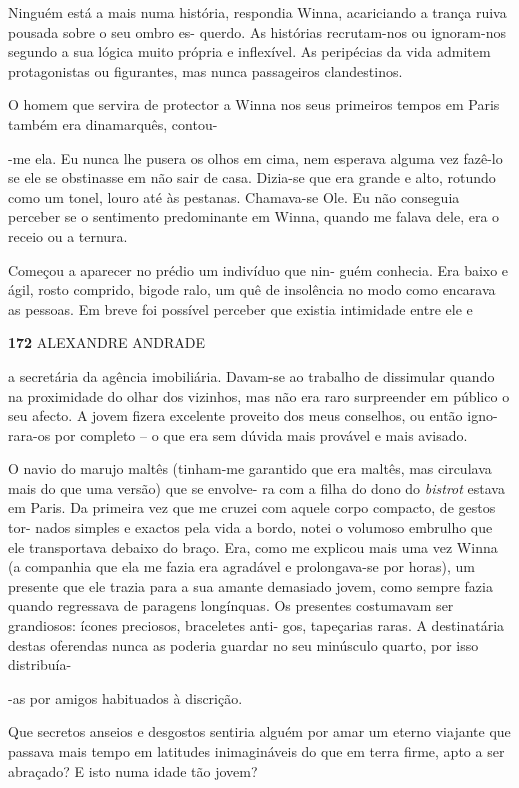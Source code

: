 Ninguém está a mais numa história, respondia Winna, acariciando a trança
ruiva pousada sobre o seu ombro es- querdo. As histórias recrutam-nos ou
ignoram-nos segundo a sua lógica muito própria e inflexível. As
peripécias da vida admitem protagonistas ou figurantes, mas nunca
passageiros clandestinos.

O homem que servira de protector a Winna nos seus primeiros tempos em
Paris também era dinamarquês, contou-

-me ela. Eu nunca lhe pusera os olhos em cima, nem esperava alguma vez
fazê-lo se ele se obstinasse em não sair de casa. Dizia-se que era
grande e alto, rotundo como um tonel, louro até às pestanas. Chamava-se
Ole. Eu não conseguia perceber se o sentimento predominante em Winna,
quando me falava dele, era o receio ou a ternura.

Começou a aparecer no prédio um indivíduo que nin- guém conhecia. Era
baixo e ágil, rosto comprido, bigode ralo, um quê de insolência no modo
como encarava as pessoas. Em breve foi possível perceber que existia
intimidade entre ele e

\textbf{172 }ALEXANDRE ANDRADE

a secretária da agência imobiliária. Davam-se ao trabalho de dissimular
quando na proximidade do olhar dos vizinhos, mas não era raro
surpreender em público o seu afecto. A jovem fizera excelente proveito
dos meus conselhos, ou então igno- rara-os por completo -- o que era sem
dúvida mais provável e mais avisado.

O navio do marujo maltês (tinham-me garantido que era maltês, mas
circulava mais do que uma versão) que se envolve- ra com a filha do dono
do \emph{bistrot }estava em Paris. Da primeira vez que me cruzei com
aquele corpo compacto, de gestos tor- nados simples e exactos pela vida
a bordo, notei o volumoso embrulho que ele transportava debaixo do
braço. Era, como me explicou mais uma vez Winna (a companhia que ela me
fazia era agradável e prolongava-se por horas), um presente que ele
trazia para a sua amante demasiado jovem, como sempre fazia quando
regressava de paragens longínquas. Os presentes costumavam ser
grandiosos: ícones preciosos, braceletes anti- gos, tapeçarias raras. A
destinatária destas oferendas nunca as poderia guardar no seu minúsculo
quarto, por isso distribuía-

-as por amigos habituados à discrição.

Que secretos anseios e desgostos sentiria alguém por amar um eterno
viajante que passava mais tempo em latitudes inimagináveis do que em
terra firme, apto a ser abraçado? E isto numa idade tão jovem?

